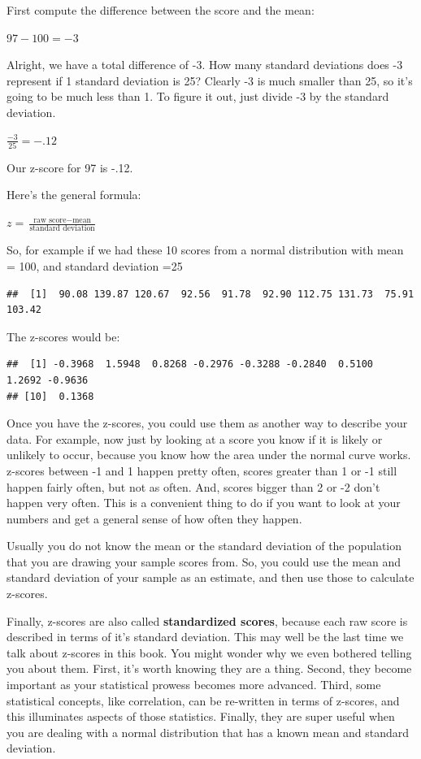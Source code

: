 \documentclass[
]{book}
\begin{document}
First compute the difference between the score and the mean:

\(97-100 = -3\)

Alright, we have a total difference of -3. How many standard deviations does -3 represent if 1 standard deviation is 25? Clearly -3 is much smaller than 25, so it's going to be much less than 1. To figure it out, just divide -3 by the standard deviation.

\(\frac{-3}{25} = -.12\)

Our z-score for 97 is -.12.

Here's the general formula:

\(z = \frac{\text{raw score} - \text{mean}}{\text{standard deviation}}\)

So, for example if we had these 10 scores from a normal distribution with mean = 100, and standard deviation =25

\begin{verbatim}
##  [1]  90.08 139.87 120.67  92.56  91.78  92.90 112.75 131.73  75.91 103.42
\end{verbatim}

The z-scores would be:

\begin{verbatim}
##  [1] -0.3968  1.5948  0.8268 -0.2976 -0.3288 -0.2840  0.5100  1.2692 -0.9636
## [10]  0.1368
\end{verbatim}

Once you have the z-scores, you could use them as another way to describe your data. For example, now just by looking at a score you know if it is likely or unlikely to occur, because you know how the area under the normal curve works. z-scores between -1 and 1 happen pretty often, scores greater than 1 or -1 still happen fairly often, but not as often. And, scores bigger than 2 or -2 don't happen very often. This is a convenient thing to do if you want to look at your numbers and get a general sense of how often they happen.

Usually you do not know the mean or the standard deviation of the population that you are drawing your sample scores from. So, you could use the mean and standard deviation of your sample as an estimate, and then use those to calculate z-scores.

Finally, z-scores are also called \textbf{standardized scores}, because each raw score is described in terms of it's standard deviation. This may well be the last time we talk about z-scores in this book. You might wonder why we even bothered telling you about them. First, it's worth knowing they are a thing. Second, they become important as your statistical prowess becomes more advanced. Third, some statistical concepts, like correlation, can be re-written in terms of z-scores, and this illuminates aspects of those statistics. Finally, they are super useful when you are dealing with a normal distribution that has a known mean and standard deviation.
\end{document}
